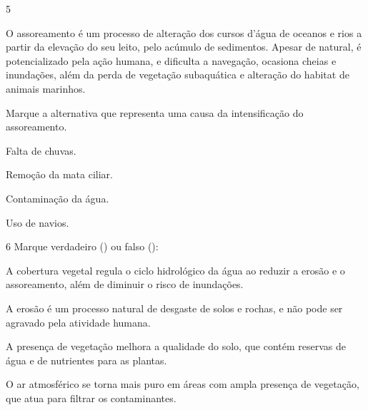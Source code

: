 \num{5}

O assoreamento é um processo de alteração dos cursos
d'água de oceanos e rios a partir da elevação do seu leito, pelo acúmulo
de sedimentos. Apesar de natural, é potencializado pela ação humana, e
dificulta a navegação, ocasiona cheias e inundações, além da perda de
vegetação subaquática e alteração do habitat de animais marinhos.

Marque a alternativa que representa uma causa da intensificação do
assoreamento.

\begin{minipage}{.5\textwidth}
\begin{escolha}
\item Falta de chuvas.

\item Remoção da mata ciliar.

\item Contaminação da água.

\item Uso de navios.
\end{escolha}
\end{minipage}

\num{6} Marque verdadeiro () ou falso ():

\begin{boxlist}
 A cobertura vegetal regula o ciclo hidrológico da água ao reduzir 
a erosão e o assoreamento, além de diminuir o risco de inundações.

 A erosão é um processo natural de desgaste de solos e rochas, e 
não pode ser agravado pela atividade humana.

 A presença de vegetação melhora a qualidade do solo, que contém 
reservas de água e de nutrientes para as plantas.

 O ar atmosférico se torna mais puro em áreas com ampla presença de 
vegetação, que atua para filtrar os contaminantes.
\end{boxlist}


